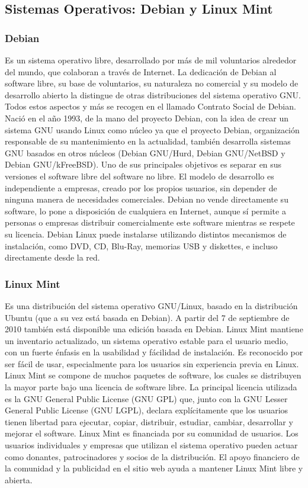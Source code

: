 \documentclass[12pt,a4paper]{report}
\begin{document}
\subsection{Sistemas Operativos: Debian y Linux Mint}

\subsubsection{Debian}

Es un sistema operativo libre, desarrollado por más de mil voluntarios alrededor
del mundo, que colaboran a través de Internet.  La dedicación de Debian al
software libre, su base de voluntarios, su naturaleza no comercial y su modelo
de desarrollo abierto la distingue de otras distribuciones del sistema operativo
GNU. Todos estos aspectos y más se recogen en el llamado Contrato Social de
Debian.  Nació en el año 1993, de la mano del proyecto Debian, con la idea de
crear un sistema GNU usando Linux como núcleo ya que el proyecto Debian,
organización responsable de su mantenimiento en la actualidad, también
desarrolla sistemas GNU basados en otros núcleos (Debian GNU/Hurd, Debian
GNU/NetBSD y Debian GNU/kFreeBSD).  Uno de sus principales objetivos es separar
en sus versiones el software libre del software no libre. El modelo de
desarrollo es independiente a empresas, creado por los propios usuarios, sin
depender de ninguna manera de necesidades comerciales. Debian no vende
directamente su software, lo pone a disposición de cualquiera en Internet,
aunque sí permite a personas o empresas distribuir comercialmente este software
mientras se respete su licencia.  Debian Linux puede instalarse utilizando
distintos mecanismos de instalación, como DVD, CD, Blu-Ray, memorias USB y
diskettes, e incluso directamente desde la red.

\subsubsection{Linux Mint}

Es una distribución del sistema operativo GNU/Linux, basado en la distribución
Ubuntu (que a su vez está basada en Debian). A partir del 7 de septiembre de
2010 también está disponible una edición basada en Debian.  Linux Mint mantiene
un inventario actualizado, un sistema operativo estable para el usuario medio,
con un fuerte énfasis en la usabilidad y fácilidad de instalación. Es reconocido
por ser fácil de usar, especialmente para los usuarios sin experiencia previa en
Linux.  Linux Mint se compone de muchos paquetes de software, los cuales se
distribuyen la mayor parte bajo una licencia de software libre. La principal
licencia utilizada es la GNU General Public License (GNU GPL) que, junto con la
GNU Lesser General Public License (GNU LGPL), declara explícitamente que los
usuarios tienen libertad para ejecutar, copiar, distribuir, estudiar, cambiar,
desarrollar y mejorar el software. Linux Mint es financiada por su comunidad de
usuarios. Los usuarios individuales y empresas que utilizan el sistema operativo
pueden actuar como donantes, patrocinadores y socios de la distribución. El
apoyo financiero de la comunidad y la publicidad en el sitio web ayuda a
mantener Linux Mint libre y abierta.
\end{document}

